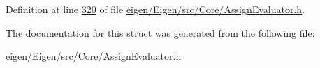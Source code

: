 Definition at line \hyperlink{eigen_2_eigen_2src_2_core_2_assign_evaluator_8h_source_l00320}{320} of file \hyperlink{eigen_2_eigen_2src_2_core_2_assign_evaluator_8h_source}{eigen/\+Eigen/src/\+Core/\+Assign\+Evaluator.\+h}.



The documentation for this struct was generated from the following file\+:\begin{DoxyCompactItemize}
\item 
eigen/\+Eigen/src/\+Core/\+Assign\+Evaluator.\+h\end{DoxyCompactItemize}
